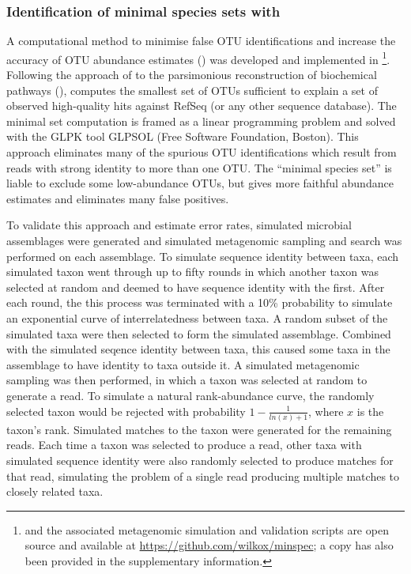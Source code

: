 \subsubsection{Identification of minimal species sets with }

A computational method to minimise false \ac{OTU} identifications and increase the accuracy of \ac{OTU} abundance estimates () was developed and implemented in \footnote{ and the associated metagenomic simulation and validation scripts are open source and available at \url{https://github.com/wilkox/minspec}; a copy has also been provided in the supplementary information.}.
Following the approach of \citet{Ye:2009bl} to the parsimonious reconstruction of biochemical pathways (),  computes the smallest set of OTUs sufficient to explain a set of observed high-quality hits against RefSeq (or any other sequence database).
The minimal set computation is framed as a linear programming problem and solved with the \ac{GLPK} tool \ac{GLPSOL} (Free Software Foundation, Boston).
This approach eliminates many of the spurious \ac{OTU} identifications which result from reads with strong identity to more than one \ac{OTU}. 
The ``minimal species set'' is liable to exclude some low-abundance \acp{OTU}, but gives more faithful abundance estimates and eliminates many false positives.

To validate this approach and estimate error rates, simulated microbial assemblages were generated and simulated metagenomic sampling and  search was performed on each assemblage.
To simulate sequence identity between taxa, each simulated taxon went through up to fifty rounds in which another taxon was selected at random and deemed to have sequence identity with the first.
After each round, the this process was terminated with a 10\% probability to simulate an exponential curve of interrelatedness between taxa.
A random subset of the simulated taxa were then selected to form the simulated assemblage.
Combined with the simulated seqence identity between taxa, this caused some taxa in the assemblage to have identity to taxa outside it.
A simulated metagenomic sampling was then performed, in which a taxon was selected at random to generate a read.
To simulate a natural rank-abundance curve, the randomly selected taxon would be rejected with probability $1 - \frac{1}{ln(x)+1}$, where $x$ is the taxon's rank.
Simulated  matches to the taxon were generated for the remaining reads.
Each time a taxon was selected to produce a read, other taxa with simulated sequence identity were also randomly selected to produce  matches for that read, simulating the problem of a single read producing multiple matches to closely related taxa.

